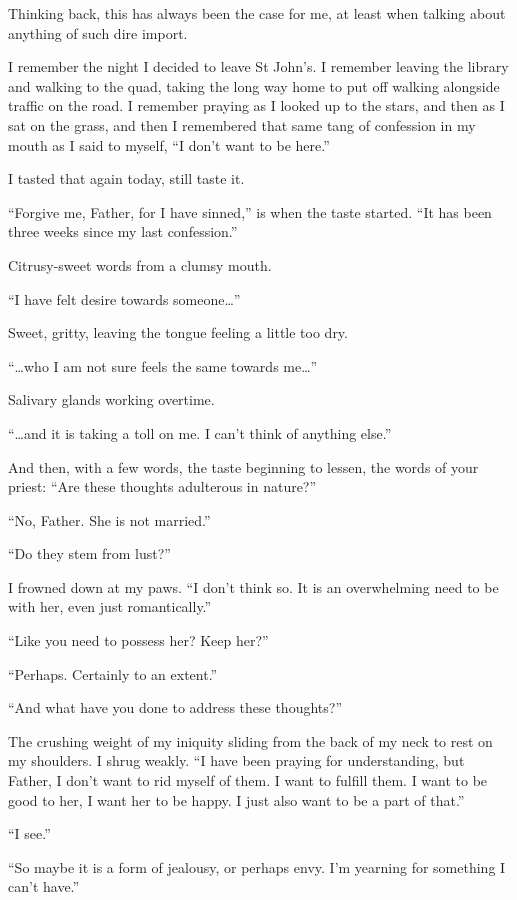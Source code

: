 Thinking back, this has always been the case for me, at least when talking about anything of such dire import.

I remember the night I decided to leave St John's. I remember leaving the library and walking to the quad, taking the long way home to put off walking alongside traffic on the road. I remember praying as I looked up to the stars, and then as I sat on the grass, and then I remembered that same tang of confession in my mouth as I said to myself, ``I don't want to be here.''

I tasted that again today, still taste it.

``Forgive me, Father, for I have sinned,'' is when the taste started. ``It has been three weeks since my last confession.''

Citrusy-sweet words from a clumsy mouth.

``I have felt desire towards someone\ldots{}''

Sweet, gritty, leaving the tongue feeling a little too dry.

``\ldots who I am not sure feels the same towards me\ldots{}''

Salivary glands working overtime.

``\ldots and it is taking a toll on me. I can't think of anything else.''

And then, with a few words, the taste beginning to lessen, the words of your priest: ``Are these thoughts adulterous in nature?''

``No, Father. She is not married.''

``Do they stem from lust?''

I frowned down at my paws. ``I don't think so. It is an overwhelming need to be with her, even just romantically.''

``Like you need to possess her? Keep her?''

``Perhaps. Certainly to an extent.''

``And what have you done to address these thoughts?''

The crushing weight of my iniquity sliding from the back of my neck to rest on my shoulders. I shrug weakly. ``I have been praying for understanding, but Father, I don't want to rid myself of them. I want to fulfill them. I want to be good to her, I want her to be happy. I just also want to be a part of that.''

``I see.''

``So maybe it is a form of jealousy, or perhaps envy. I'm yearning for something I can't have.''


